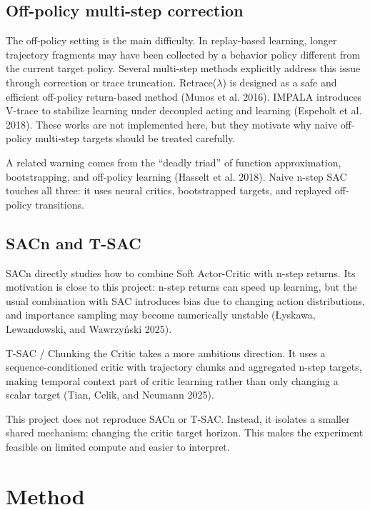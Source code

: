 \documentclass[
  american,
]{article}
\begin{document}
\subsection{Off-policy multi-step
correction}\label{off-policy-multi-step-correction}

The off-policy setting is the main difficulty. In replay-based learning,
longer trajectory fragments may have been collected by a behavior policy
different from the current target policy. Several multi-step methods
explicitly address this issue through correction or trace truncation.
Retrace(\(\lambda\)) is designed as a safe and efficient off-policy
return-based method (Munos et al. 2016). IMPALA introduces V-trace to
stabilize learning under decoupled acting and learning (Espeholt et al.
2018). These works are not implemented here, but they motivate why naive
off-policy multi-step targets should be treated carefully.

A related warning comes from the ``deadly triad'' of function
approximation, bootstrapping, and off-policy learning (Hasselt et al.
2018). Naive n-step SAC touches all three: it uses neural critics,
bootstrapped targets, and replayed off-policy transitions.

\subsection{SACn and T-SAC}\label{sacn-and-t-sac}

SACn directly studies how to combine Soft Actor-Critic with n-step
returns. Its motivation is close to this project: n-step returns can
speed up learning, but the usual combination with SAC introduces bias
due to changing action distributions, and importance sampling may become
numerically unstable (Łyskawa, Lewandowski, and Wawrzyński 2025).

T-SAC / Chunking the Critic takes a more ambitious direction. It uses a
sequence-conditioned critic with trajectory chunks and aggregated n-step
targets, making temporal context part of critic learning rather than
only changing a scalar target (Tian, Celik, and Neumann 2025).

This project does not reproduce SACn or T-SAC. Instead, it isolates a
smaller shared mechanism: changing the critic target horizon. This makes
the experiment feasible on limited compute and easier to interpret.

\section{Method}\label{method}
\end{document}
